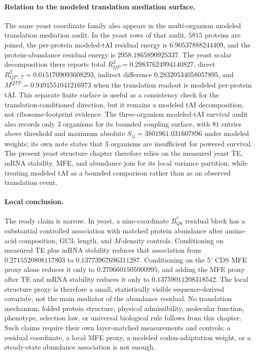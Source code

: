 \paragraph{Relation to the modeled translation mediation surface.}
The same yeast coordinate family also appears in the multi-organism modeled translation mediation audit.  In the yeast rows of that audit, $5815$ proteins are joined, the per-protein modeled-tAI residual energy is $6.90537888244409$, and the protein-abundance residual energy is $2958.1865890925337$.  The yeast scalar decomposition there reports total $R^2_{QP}=0.29837624994140827$, direct $R^2_{QP\mid T}=0.0151709093608293$, indirect difference $0.28320534058057895$, and $M^{QTP}=0.9491551041216973$ when the translation readout is modeled per-protein tAI.  This separate finite surface is useful as a consistency check for the translation-conditioned direction, but it remains a modeled tAI decomposition, not ribosome-footprint evidence.  The three-organism modeled-tAI survival audit also records only $3$ organisms for its bounded coupling surface, with $81$ entries above threshold and maximum absolute $S_{ij}=3801961.031607896$ under modeled weights; its own note states that $3$ organisms are insufficient for powered survival.  The present yeast structure chapter therefore relies on the measured yeast TE, mRNA stability, MFE, and abundance join for its local variance partition, while treating modeled tAI as a bounded comparison rather than as an observed translation event.

\paragraph{Local conclusion.}
The ready claim is narrow.  In yeast, a nine-coordinate $B^*_{Q6}$ residual block has a substantial controlled association with matched protein abundance after amino-acid composition, GC3, length, and $M$-density controls.  Conditioning on measured TE plus mRNA stability reduces that association from $0.2715520808117803$ to $0.13773967696311287$.  Conditioning on the $5'$ CDS MFE proxy alone reduces it only to $0.2706601505000995$, and adding the MFE proxy after TE and mRNA stability reduces it only to $0.13759011208318542$.  The local structure proxy is therefore a small, statistically visible sequence-derived covariate, not the main mediator of the abundance residual.  No translation mechanism, folded protein structure, physical admissibility, molecular function, phenotype, selection law, or universal biological rule follows from this chapter.  Such claims require their own layer-matched measurements and controls; a residual coordinate, a local MFE proxy, a modeled codon-adaptation weight, or a steady-state abundance association is not enough.